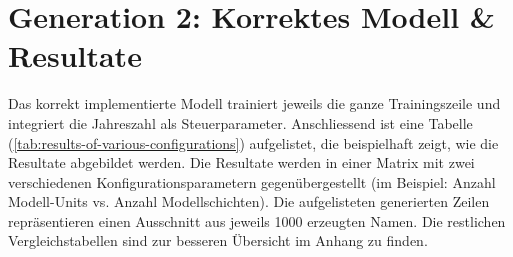 \section{Generation 2: Korrektes Modell \& Resultate}
\label{sec:correct-model}

Das korrekt implementierte Modell trainiert jeweils die ganze Trainingszeile und integriert die Jahreszahl als Steuerparameter.
Anschliessend ist eine Tabelle (\ref{tab:results-of-various-configurations}) aufgelistet, die beispielhaft zeigt, wie die Resultate abgebildet werden.
Die Resultate werden in einer Matrix mit zwei verschiedenen Konfigurationsparametern gegenübergestellt (im Beispiel: Anzahl Modell-Units vs. Anzahl Modellschichten).
Die aufgelisteten generierten Zeilen repräsentieren einen Ausschnitt aus jeweils 1000 erzeugten Namen.
Die restlichen Vergleichstabellen sind zur besseren Übersicht im Anhang zu finden.



